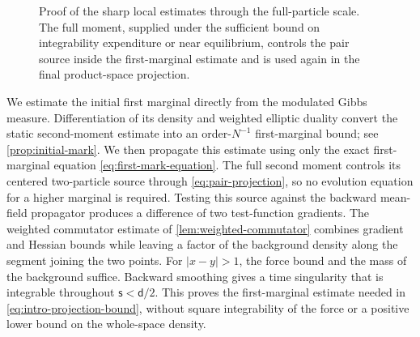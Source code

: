 \documentclass[11pt,reqno]{amsart}
\numberwithin{equation}{section}
\theoremstyle{plain}
\theoremstyle{remark}
\renewcommand{\d}{\mathsf{d}}\newcommand{\s}{\mathsf{s}}
\begin{document}
\begin{figure}[htbp]
\centering

\caption{Proof of the sharp local estimates through the full-particle scale. The full moment, supplied under the sufficient bound on integrability expenditure or near equilibrium, controls the pair source inside the first-marginal estimate and is used again in the final product-space projection.}
\label{fig:proof}
\end{figure}



We estimate the initial first marginal directly from the modulated Gibbs measure. Differentiation of its density and weighted elliptic duality convert the static second-moment estimate into an order-$N^{-1}$ first-marginal bound; see \cref{prop:initial-mark}. We then propagate this estimate using only the exact first-marginal equation \eqref{eq:first-mark-equation}. The full second moment controls its centered two-particle source through \eqref{eq:pair-projection}, so no evolution equation for a higher marginal is required. Testing this source against the backward mean-field propagator produces a difference of two test-function gradients. {The weighted commutator estimate of \cref{lem:weighted-commutator} combines gradient and Hessian bounds while leaving a factor of the background density along the segment joining the two points.} For $|x-y|>1$, the force bound and the mass of the background suffice. Backward smoothing gives a time singularity that is integrable throughout $\s<\d/2$. This proves the first-marginal estimate needed in \eqref{eq:intro-projection-bound}, without square integrability of the force or a positive lower bound on the whole-space density.
\end{document}
